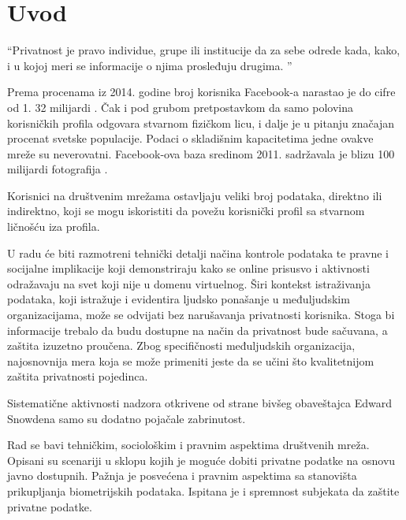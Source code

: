 \documentclass[a4paper]{article}
\begin{document}
\section{Uvod}
\label{sec:uvod}
“Privatnost je pravo individue, grupe ili institucije da za sebe odrede kada, kako, i u kojoj meri se informacije o njima prosleđuju drugima. ”\cite{Privacy and Freedom} \par Prema procenama iz 2014. godine broj korisnika Facebook-a narastao je do cifre od 1. 32 milijardi \cite{1. 32}. Čak i pod grubom
pretpostavkom da samo polovina korisničkih profila odgovara stvarnom fizičkom licu, i dalje je u pitanju značajan procenat svetske populacije. Podaci o skladišnim kapacitetima jedne ovakve mreže su neverovatni. Facebook-ova baza sredinom 2011. sadržavala je blizu 100 milijardi fotografija \cite{photetrends}.\par Korisnici na društvenim mrežama ostavljaju veliki broj podataka, direktno ili indirektno, koji se mogu iskoristiti da povežu korisnički profil sa stvarnom ličnošću iza profila.\par U radu će biti razmotreni tehnički detalji načina kontrole podataka te pravne i socijalne implikacije koji demonstriraju kako se online prisusvo i aktivnosti odražavaju na svet koji nije u domenu virtuelnog. 
Širi kontekst istraživanja podataka, koji istražuje i evidentira ljudsko ponašanje u međuljudskim organizacijama, može se odvijati bez narušavanja privatnosti korisnika. Stoga bi informacije trebalo da budu dostupne na način da privatnost bude sačuvana, a zaštita izuzetno proučena. Zbog specifičnosti međuljudskih organizacija, najosnovnija mera koja se može primeniti jeste da se učini što kvalitetnijom zaštita privatnosti pojedinca.\par Sistematične aktivnosti nadzora  otkrivene od strane bivšeg obaveštajca Edward Snowdena\cite{Edward} samo su dodatno pojačale zabrinutost.\par Rad se bavi tehničkim, sociološkim i pravnim aspektima društvenih mreža. Opisani su scenariji u sklopu kojih je moguće dobiti privatne podatke na osnovu javno dostupnih. Pažnja je posvećena i pravnim aspektima sa stanovišta prikupljanja biometrijskih podataka. Ispitana je i spremnost subjekata da zaštite privatne podatke. 

\newpage
\end{document}
